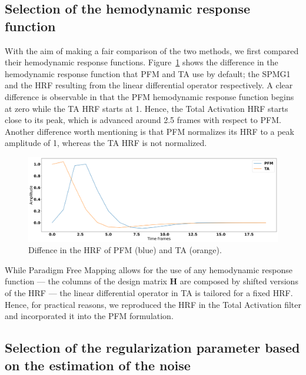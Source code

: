 \subsection{Selection of the hemodynamic response function}

With the aim of making a fair comparison of the two methods, we first compared their hemodynamic response functions. Figure~\ref{fig:hrf_diff} shows the difference in the hemodynamic response function that PFM and TA use by default; the SPMG1 and the HRF resulting from the linear differential operator respectively. A clear difference is observable in that the PFM hemodynamic response function begins at zero while the TA HRF starts at 1. Hence, the Total Activation HRF starts close to its peak, which is advanced around 2.5 frames with respect to PFM. Another difference worth mentioning is that PFM normalizes its HRF to a peak amplitude of 1, whereas the TA HRF is not normalized.

\begin{figure}[h]
    \includegraphics[width=\columnwidth]{figures/hrf_diff.png}
    \caption{Diffence in the HRF of PFM (blue) and TA (orange).}
\label{fig:hrf_diff}
\end{figure}

While Paradigm Free Mapping allows for the use of any hemodynamic response function --- the columns of the design matrix \(\mathbf{H}\) are composed by shifted versions of the HRF --- the linear differential operator in TA is tailored for a fixed HRF. Hence, for practical reasons, we reproduced the HRF in the Total Activation filter and incorporated it into the PFM formulation.

\subsection{Selection of the regularization parameter based on the estimation of the noise}

